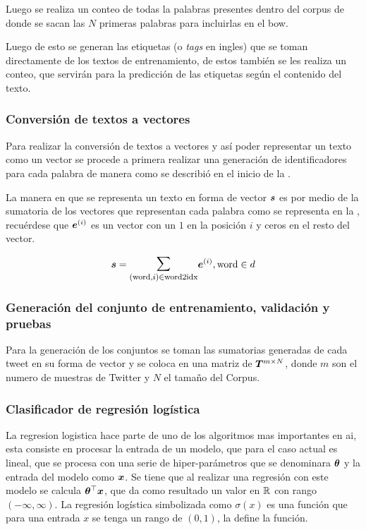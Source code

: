 Luego se realiza un conteo de todas la palabras presentes dentro del corpus de donde se sacan las $N$ primeras palabras para incluirlas en el \gls{bow}.

Luego de esto se generan las etiquetas (o \emph{tags} en ingles) que se toman directamente de los textos de entrenamiento, de estos también se les realiza un conteo, que servirán para la predicción de las etiquetas según el contenido del texto.

\subsubsection{Conversión de textos a vectores}
Para realizar la conversión de textos a vectores y así poder representar un texto como un vector se procede a primera realizar una generación de identificadores para cada palabra de manera como se describió en el inicio de la .

La manera en que se representa un texto en forma de vector ${\bm{s}}$ es por medio de la sumatoria de los vectores que representan cada palabra como se representa en la , recuérdese que ${\bm{e}}^{(i)}$ es un vector con un $1$ en la posición $i$ y ceros en el resto del vector.

\begin{equation} \label{eq:bow-word-vector-sum}
  \vs = \mathlarger{\mathlarger{\sum}}_{(\text{word}, i) \in \text{word2idx}} \ve^{(i)}, \text{word} \in d
\end{equation}

\subsubsection{Generación del conjunto de entrenamiento, validación y pruebas}
Para la generación de los conjuntos se toman las sumatorias generadas de cada tweet en su forma de vector y se coloca en una matriz de ${\bm{T}}^{m \times N}$, donde $m$ son el numero de muestras de Twitter y $N$ el tamaño del Corpus.

\subsubsection{Clasificador de regresión logística}
La regresion logistica hace parte de uno de los algoritmos mas importantes en \gls{ai}, esta consiste en procesar la entrada de un modelo, que para el caso actual es lineal, que se procesa con una serie de hiper-parámetros que se denominara ${\bm{\theta}}$ y la entrada del modelo como ${\bm{x}}$. Se tiene que al realizar una regresión con este modelo se calcula ${\bm{\theta}}^{\top} {\bm{x}}$, que da como resultado un valor en $\mathbb{R}$ con rango $(-\infty, \infty)$. La regresión logística simbolizada como $\sigma(x)$ es una función que para una entrada $x$ se tenga un rango de $(0, 1)$, la  define la función.

